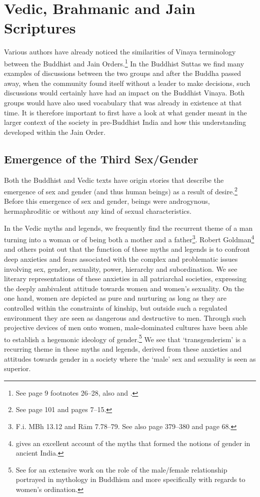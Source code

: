 \section{Vedic, Brahmanic and Jain Scriptures}

Various authors have already noticed the similarities of Vinaya terminology between the Buddhist and Jain Orders.\footnote{See \cite{maes2016} page 9 footnotes 26–28, also \cite{sujato2009} and \cite{zwilling}.} In the Buddhist Suttas we find many examples of discussions between the two groups and after the Buddha passed away, when the community found itself without a leader to make decisions, such discussions would certainly have had an impact on the Buddhist Vinaya. Both groups would have also used vocabulary that was already in existence at that time. It is therefore important to first have a look at what gender meant in the larger context of the society in pre-Buddhist India and how this understanding developed within the Jain Order.

\subsection{Emergence of the Third Sex/Gender}
Both the Buddhist and Vedic texts have origin stories that describe the emergence of sex and gender (and thus human beings) as a result of desire.\footnote{See \cite{zilling2000} page 101 and \cite{artinger} pages 7–15.} Before this emergence of sex and gender, beings were androgynous, hermaphroditic or without any kind of sexual characteristics.

In the Vedic myths and legends, we frequently find the recurrent theme of a man turning into a woman or of being both a mother and a father\footnote{F.i. MBh 13.12 and Rām 7.78–79. See also \cite{goldman} page 379–380 and \cite{cassell} page 68.}. Robert Goldman\footnote{\cite{goldman} gives an excellent account of the myths that formed the notions of gender in ancient India.} and others point out that the function of these myths and legends is to confront deep anxieties and fears associated with the complex and problematic issues involving sex, gender, sexuality, power, hierarchy and subordination. We see literary representations of these anxieties in all patriarchal societies, expressing the deeply ambivalent attitude towards women and women's sexuality. On the one hand, women are depicted as pure and nurturing as long as they are controlled within the constraints of kinship, but outside such a regulated environment they are seen as dangerous and destructive to men. Through such projective devices of men onto women, male-dominated cultures have been able to establish a hegemonic ideology of gender.\footnote{See \cite{sujato2011} for an extensive work on the role of the male/female relationship portrayed in mythology in Buddhism and more specifically with regards to women's ordination.} We see that `transgenderism' is a recurring theme in these myths and legends, derived from these anxieties and attitudes towards gender in a society where the `male' sex and sexuality is seen as superior.

